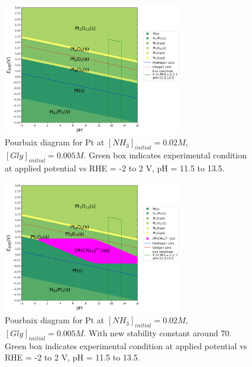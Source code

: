 \documentclass[journal=jacsat,manuscript=article,email=false]{achemso}
\begin{document}
\begin{figure}[htbp]
    \centering
    \includegraphics[width=0.7\textwidth]{Figures/pourbaix_diagrams/Pt-NH3-H2O_activity=1e-04_[NH3]=0.02M_[Gly]=0.005M_[CN]=0.0001.png}
    \caption{Pourbaix diagram for Pt at $[NH_3]_{initial}= 0.02M$, $[Gly]_{initial}=0.005M$. Green box indicates experimental condition at applied potential vs RHE = -2 to 2 V, pH = 11.5 to 13.5.}
    \label{fig:Pt_Pourbaix_NH3_Gly_SI}
\end{figure}
\begin{figure}[htbp]
    \centering
    \includegraphics[width=0.7\textwidth]{Figures/pourbaix_diagrams/Pt-NH3-H2O_activity_Harrington_Pt_70=1e-04_[NH3]=0.02M_[Gly]=0.005M_[CN]=0.0001.png}
    \caption{Pourbaix diagram for Pt at $[NH_3]_{initial}= 0.02M$, $[Gly]_{initial}=0.005M$. With new stability constant around 70. Green box indicates experimental condition at applied potential vs RHE = -2 to 2 V, pH = 11.5 to 13.5.}
    \label{fig:Pt_Pourbaix_NH3_Gly_SI}
\end{figure}

\newpage


\newpage


\newpage


\newpage


\end{document}
